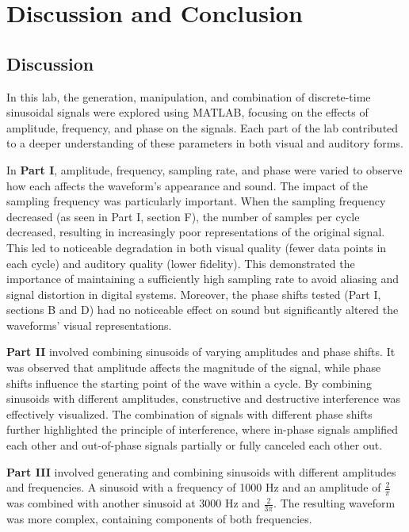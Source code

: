 \documentclass{article}
\begin{document}
\section{Discussion and Conclusion}

\subsection{Discussion}

In this lab, the generation, manipulation, and combination of discrete-time 
sinusoidal signals were explored using MATLAB, focusing on the effects of amplitude, 
frequency, and phase on the signals. Each part of the lab contributed to a deeper 
understanding of these parameters in both visual and auditory forms.
\newline

In \textbf{Part I}, amplitude, frequency, sampling rate, and phase were varied to 
observe how each affects the waveform's appearance and sound. 
The impact of the sampling frequency was particularly important. When the sampling 
frequency decreased (as seen in Part I, section F), the number of samples per cycle 
decreased, resulting in increasingly poor representations of the original signal. 
This led to noticeable degradation in both visual quality (fewer data points in each 
cycle) and auditory quality (lower fidelity). This demonstrated the importance of 
maintaining a sufficiently high sampling rate to avoid aliasing and signal distortion 
in digital systems. Moreover, the phase shifts tested (Part I, sections B and D) had 
no noticeable effect on sound but significantly altered the waveforms' visual 
representations.
\newline

\textbf{Part II} involved combining sinusoids of varying amplitudes and phase shifts. 
It was observed that amplitude affects the magnitude of the signal, while phase shifts 
influence the starting point of the wave within a cycle. By combining sinusoids with 
different amplitudes, constructive and destructive interference was effectively 
visualized. The combination of signals with different phase shifts further highlighted 
the principle of interference, where in-phase signals amplified each other and 
out-of-phase signals partially or fully canceled each other out.
\newline

\textbf{Part III} involved generating and combining sinusoids with different 
amplitudes and frequencies. A sinusoid with a frequency of 1000 Hz and an amplitude 
of \( \frac{2}{\pi} \) was combined with another sinusoid at 3000 Hz and 
\( \frac{2}{3\pi} \). The resulting waveform was more complex, containing components 
of both frequencies. 
\newline
\end{document}

